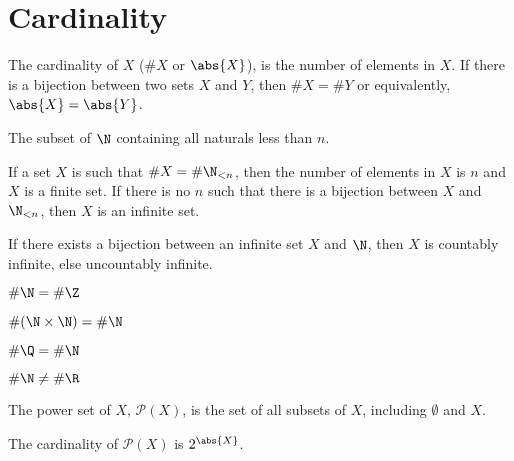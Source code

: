 \documentclass{article}
\begin{document}
\section{Cardinality}
\nopagebreak
\begin{multicols}{2}
    \begin{definition}[Cardinality]
        The cardinality of \(X\) (\(\#X\) or \(\abs{X}\)), is the number of elements in \(X\).
        If there is a bijection between two sets \(X\) and \(Y\),
        then \(\#X=\#Y\) or equivalently, \(\abs{X} = \abs{Y}\).
    \end{definition}
    \begin{definition}[\(\N_{<n}\)]
        The subset of \(\N\) containing all naturals less than \(n\).
    \end{definition}
    \begin{definition}
        If a set \(X\) is such that \(\#X=\#\N_{<n}\),
        then the number of elements in \(X\) is \(n\) and \(X\) is a finite set.
        If there is no \(n\) such that there is a bijection between \(X\) and \(\N_{<n}\),
        then \(X\) is an infinite set.
    \end{definition}
    \begin{definition}
        If there exists a bijection between an infinite set \(X\) and \(\N\),
        then \(X\) is countably infinite, else uncountably infinite.
    \end{definition}
    \columnbreak
    \begin{theorem}\(\#\N = \#\Z\)\end{theorem}
    \begin{theorem}\(\#(\N\times\N) = \#\N\)\end{theorem}
    \begin{theorem}\(\#\Q = \#\N\)\end{theorem}
    \begin{theorem}\(\#\N \ne \#\R\)\end{theorem}
    \begin{definition}
        The power set of \(X\), \(\mathscr{P}(X)\), is the set of all subsets of \(X\),
        including \(\emptyset\) and \(X\).
    \end{definition}
    \begin{theorem}
        The cardinality of \(\mathscr{P}(X)\) is \(2^{\abs{X}}\).
    \end{theorem}
\end{multicols}
%
\end{document}
